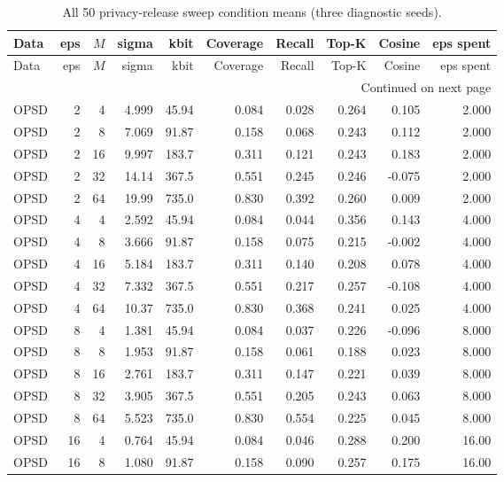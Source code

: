 

\setlength{\tabcolsep}{3pt}
\renewcommand{\arraystretch}{1.08}
\begin{longtable}{lrrrrrrrrr}
\caption{All 50 privacy-release sweep condition means (three diagnostic seeds).}\label{tab:sweep50}\\
\toprule
Data & eps & $M$ & sigma & kbit & Coverage & Recall & Top-K & Cosine & eps spent \\
\midrule
\endfirsthead
\toprule
Data & eps & $M$ & sigma & kbit & Coverage & Recall & Top-K & Cosine & eps spent \\
\midrule
\endhead
\midrule
\multicolumn{10}{r}{Continued on next page} \\
\endfoot
\bottomrule
\endlastfoot
OPSD & 2 & 4 & 4.999 & 45.94 & 0.084 & 0.028 & 0.264 & 0.105 & 2.000 \\
OPSD & 2 & 8 & 7.069 & 91.87 & 0.158 & 0.068 & 0.243 & 0.112 & 2.000 \\
OPSD & 2 & 16 & 9.997 & 183.7 & 0.311 & 0.121 & 0.243 & 0.183 & 2.000 \\
OPSD & 2 & 32 & 14.14 & 367.5 & 0.551 & 0.245 & 0.246 & -0.075 & 2.000 \\
OPSD & 2 & 64 & 19.99 & 735.0 & 0.830 & 0.392 & 0.260 & 0.009 & 2.000 \\
OPSD & 4 & 4 & 2.592 & 45.94 & 0.084 & 0.044 & 0.356 & 0.143 & 4.000 \\
OPSD & 4 & 8 & 3.666 & 91.87 & 0.158 & 0.075 & 0.215 & -0.002 & 4.000 \\
OPSD & 4 & 16 & 5.184 & 183.7 & 0.311 & 0.140 & 0.208 & 0.078 & 4.000 \\
OPSD & 4 & 32 & 7.332 & 367.5 & 0.551 & 0.217 & 0.257 & -0.108 & 4.000 \\
OPSD & 4 & 64 & 10.37 & 735.0 & 0.830 & 0.368 & 0.241 & 0.025 & 4.000 \\
OPSD & 8 & 4 & 1.381 & 45.94 & 0.084 & 0.037 & 0.226 & -0.096 & 8.000 \\
OPSD & 8 & 8 & 1.953 & 91.87 & 0.158 & 0.061 & 0.188 & 0.023 & 8.000 \\
OPSD & 8 & 16 & 2.761 & 183.7 & 0.311 & 0.147 & 0.221 & 0.039 & 8.000 \\
OPSD & 8 & 32 & 3.905 & 367.5 & 0.551 & 0.205 & 0.243 & 0.063 & 8.000 \\
OPSD & 8 & 64 & 5.523 & 735.0 & 0.830 & 0.554 & 0.225 & 0.045 & 8.000 \\
OPSD & 16 & 4 & 0.764 & 45.94 & 0.084 & 0.046 & 0.288 & 0.200 & 16.00 \\
OPSD & 16 & 8 & 1.080 & 91.87 & 0.158 & 0.090 & 0.257 & 0.175 & 16.00 \\

\end{longtable}
